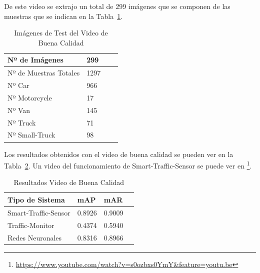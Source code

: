 De este video se extrajo un total de 299 imágenes que se componen de las muestras que se indican en la Tabla~\ref{tabla_video_bueno}.

\begin{table}[htbp]
\begin{center}
\begin{tabular}{|l|l|l|l|}
\hline
Nº de Imágenes  & 299 \\
\hline \hline
Nº de Muestras Totales & 1297\\ \hline
Nº Car & 966 \\ \hline
Nº Motorcycle & 17 \\ \hline
Nº Van & 145 \\ \hline
Nº Truck & 71 \\ \hline
Nº Small-Truck & 98 \\ \hline
\end{tabular}
\caption{Imágenes de Test del Video de Buena Calidad}
\label{tabla_video_bueno}
\end{center}
\end{table}

Los resultados obtenidos con el video de buena calidad se pueden ver en la Tabla~\ref{resultados_video_bueno}. Un video del funcionamiento de Smart-Traffic-Sensor se puede ver en \footnote{\url{https://www.youtube.com/watch?v=s0ozbxs0YmY&feature=youtu.be}}.

\begin{table}[htbp]
\begin{center}
\begin{tabular}{|l|l|l|l|}
\hline
Tipo de Sistema & mAP & mAR  \\ 
\hline \hline
Smart-Traffic-Sensor & 0.8926 & 0.9009 \\ \hline
Traffic-Monitor & 0.4374 & 0.5940 \\ \hline
Redes Neuronales & 0.8316 & 0.8966\\ \hline
\end{tabular}
\caption{Resultados Video de Buena Calidad}
\label{resultados_video_bueno}
\end{center}
\end{table}


